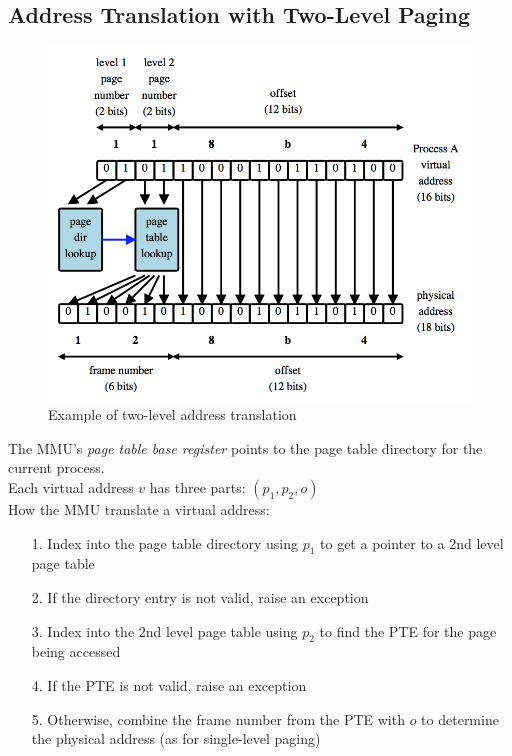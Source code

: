 \documentclass[12pt]{article}
\theoremstyle{plain}
\theoremstyle{definition}
\begin{document}
\subsection{Address Translation with Two-Level Paging}
\begin{figure}[ht]
  \centering
  \includegraphics[scale=0.7]{pictures/two_level_paing_trans.png}
  \caption{Example of two-level address translation}
  \label{fig:two_level_addr_translation}
\end{figure}
The MMU's \emph{page table base register} points to the page table directory for the current process. \\
Each virtual address $v$ has three parts: $(p_{1}, p_{2}, o)$ \\
How the MMU translate a virtual address:
\begin{enumerate}
  \item[1.] Index into the page table directory using $p_{1}$ to get a pointer to a 2nd level page table
  \item[2.] If the directory entry is not valid, raise an exception
  \item[3.] Index into the 2nd level page table using $p_{2}$ to find the PTE for the page being accessed
  \item[4.] If the PTE is not valid, raise an exception
  \item[5.] Otherwise, combine the frame number from the PTE with $o$ to determine the physical address (as for single-level paging)
\end{enumerate}
\end{document}
